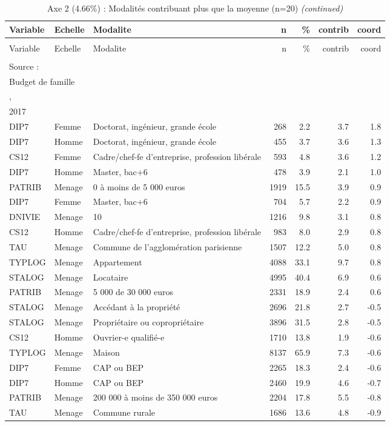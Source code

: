 \documentclass[
  12pt,
]{book}
\begin{document}
\begin{longtable}[t]{lllrrrr}
\caption{Axe 2 (4.66\%) : Modalités contribuant plus que la moyenne  (n=20)}\\
\toprule
Variable & Echelle & Modalite & n & \% & contrib & coord\\
\midrule
\endfirsthead
\caption[]{Axe 2 (4.66\%) : Modalités contribuant plus que la moyenne  (n=20) \textit{(continued)}}\\
\toprule
Variable & Echelle & Modalite & n & \% & contrib & coord\\
\midrule
\endhead

\endfoot
\bottomrule
\multicolumn{7}{l}{\rule{0pt}{1em}\textit{Note: }}\\
\multicolumn{7}{l}{\rule{0pt}{1em}Source :}\\
\multicolumn{7}{l}{\rule{0pt}{1em}Budget de famille}\\
\multicolumn{7}{l}{\rule{0pt}{1em}, }\\
\multicolumn{7}{l}{\rule{0pt}{1em}2017}\\
\endlastfoot
DIP7 & Femme & Doctorat, ingénieur, grande école & 268 & 2.2 & 3.7 & 1.8\\
DIP7 & Homme & Doctorat, ingénieur, grande école & 455 & 3.7 & 3.6 & 1.3\\
CS12 & Femme & Cadre/chef-fe d'entreprise, profession libérale & 593 & 4.8 & 3.6 & 1.2\\
DIP7 & Homme & Master, bac+6 & 478 & 3.9 & 2.1 & 1.0\\
PATRIB & Menage & 0 à moins de 5 000 euros & 1919 & 15.5 & 3.9 & 0.9\\
\addlinespace
DIP7 & Femme & Master, bac+6 & 704 & 5.7 & 2.2 & 0.9\\
DNIVIE & Menage & 10 & 1216 & 9.8 & 3.1 & 0.8\\
CS12 & Homme & Cadre/chef-fe d'entreprise, profession libérale & 983 & 8.0 & 2.9 & 0.8\\
TAU & Menage & Commune de l'agglomération parisienne & 1507 & 12.2 & 5.0 & 0.8\\
TYPLOG & Menage & Appartement & 4088 & 33.1 & 9.7 & 0.8\\
\addlinespace
STALOG & Menage & Locataire & 4995 & 40.4 & 6.9 & 0.6\\
PATRIB & Menage & 5 000 de 30 000 euros & 2331 & 18.9 & 2.4 & 0.6\\
STALOG & Menage & Accédant à la propriété & 2696 & 21.8 & 2.7 & -0.5\\
STALOG & Menage & Propriétaire ou copropriétaire & 3896 & 31.5 & 2.8 & -0.5\\
CS12 & Homme & Ouvrier-e qualifié-e & 1710 & 13.8 & 1.9 & -0.6\\
\addlinespace
TYPLOG & Menage & Maison & 8137 & 65.9 & 7.3 & -0.6\\
DIP7 & Femme & CAP ou BEP & 2265 & 18.3 & 2.4 & -0.6\\
DIP7 & Homme & CAP ou BEP & 2460 & 19.9 & 4.6 & -0.7\\
PATRIB & Menage & 200 000 à moins de 350 000 euros & 2204 & 17.8 & 5.5 & -0.8\\
TAU & Menage & Commune rurale & 1686 & 13.6 & 4.8 & -0.9\\*
\end{longtable}
\endgroup{}
\end{document}
